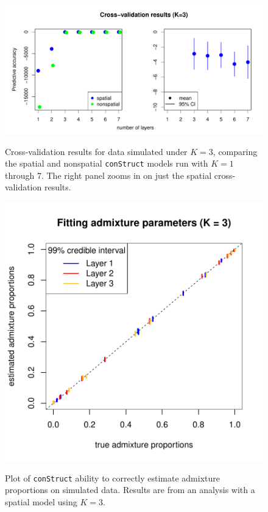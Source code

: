 \documentclass[10pt,letterpaper]{article}
\begin{document}
\begin{figure}
	\centering
		{\includegraphics[width=\textwidth]{figs/sims/simK3_std_xval.pdf}}
		\caption{
			Cross-validation results for data simulated under $K=3$,
			comparing the spatial and nonspatial \texttt{conStruct} models run with $K=1$ through 7.  
			The right panel zooms in on just the spatial cross-validation results.
		}\label{simK3_xval}
\end{figure}

\begin{figure}
	\centering
		{\includegraphics[width=\textwidth]{figs/sims/simK3_adprop_fit.pdf}}
		\caption{
			Plot of \texttt{conStruct} ability to correctly estimate admixture proportions on simulated data.
			Results are from an analysis with a spatial model using $K=3$.
		}\label{simK3_adprop_fit}
\end{figure}
\end{document}
